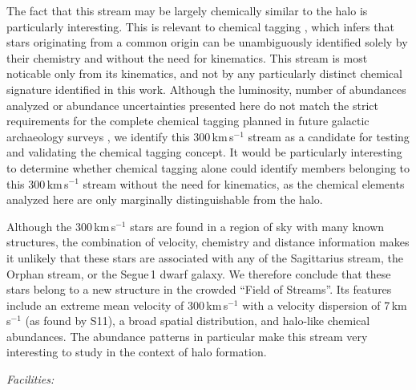 \documentclass{emulateapj}
\begin{document}
The fact that this stream may be largely chemically similar to the
halo is particularly interesting. This is relevant to chemical tagging
\citep{Freeman_Bland-Hawthorn2003}, which infers that stars
originating from a common origin can be unambiguously identified
solely by their chemistry and without the need for kinematics. This
stream is most noticable only from its kinematics, and not by any
particularly distinct chemical signature identified in this
work. Although the luminosity, number of abundances analyzed or
abundance uncertainties presented here do not match the strict
requirements for the complete chemical tagging planned in future
galactic archaeology surveys \citep{Ting2012}, we identify this
300\,km\,s$^{-1}$ stream as a candidate for testing and validating the
chemical tagging concept. It would be particularly interesting to
determine whether chemical tagging alone could identify members
belonging to this 300\,km\,s$^{-1}$ stream without the need for
kinematics, as the chemical elements analyzed here are only marginally
distinguishable from the halo.

Although the 300\,km\,s$^{-1}$ stars are found in a region of sky with
many known structures, the combination of velocity, chemistry and
distance information makes it unlikely that these stars are associated
with any of the Sagittarius stream, the Orphan stream, or the Segue\,1
dwarf galaxy. We therefore conclude that these stars belong to a new
structure in the crowded ``Field of Streams''. Its features include an
extreme mean velocity of 300\,km\,s$^{-1}$ with a velocity dispersion
of 7\,km\,s$^{-1}$ (as found by S11), a broad spatial distribution,
and halo-like chemical abundances. The abundance patterns in
particular make this stream very interesting to study in the context
of halo formation.

 



\textit{Facilities:} 
\end{document}
